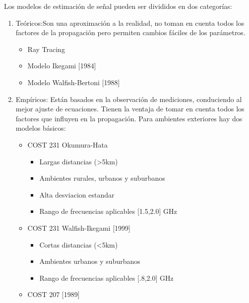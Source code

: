 Los modelos de estimación de señal pueden ser divididos en dos categorías:
\begin{enumerate}
    \item Teóricos:Son una aproximación a la realidad, no toman en cuenta todos los factores de la propagación pero permiten cambios fáciles de los parámetros. 
    \begin{itemize}
        \item Ray Tracing
        \item Modelo Ikegami [1984]
        \item Modelo Walfish-Bertoni [1988]
    \end{itemize}
    \item Empíricos: Están basados en la observación de mediciones, conduciendo al mejor ajuste de ecuaciones. Tienen la ventaja de tomar en cuenta todos los factores que influyen en la propagación.\newline
    Para ambientes exteriores hay dos modelos básicos:\newline
    \begin{itemize}
        \item COST 231 Okumura-Hata
        \begin{itemize}
            \item Largas distancias (>5km)
            \item Ambientes rurales, urbanos y suburbanos
            \item Alta desviacion estandar
            \item Rango de frecuencias aplicables [1.5,2.0] GHz
        \end{itemize}
        \item COST 231 Walfish-Ikegami [1999]
        \begin{itemize}
            \item Cortas distancias (<5km)
            \item Ambientes urbanos y suburbanos
            \item Rango de frecuencias aplicables [.8,2.0] GHz
        \end{itemize}
        \item COST 207 [1989]
    \end{itemize}
\end{enumerate}


